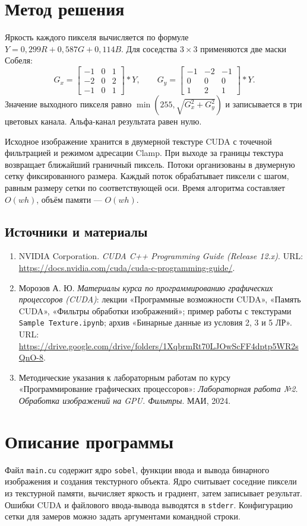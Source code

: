 \documentclass[12pt,a4paper]{article}
\begin{document}
\section{Метод решения}
Яркость каждого пикселя вычисляется по формуле $Y = 0{,}299R + 0{,}587G + 0{,}114B$. Для соседства $3\times3$ применяются две маски Собеля:
\[
G_x=\begin{bmatrix}-1&0&1\\-2&0&2\\-1&0&1\end{bmatrix} * Y,\qquad
G_y=\begin{bmatrix}-1&-2&-1\\0&0&0\\1&2&1\end{bmatrix} * Y.
\]
Значение выходного пикселя равно $\min(255,\sqrt{G_x^2+G_y^2})$ и записывается в три цветовых канала. Альфа-канал результата равен нулю.

Исходное изображение хранится в двумерной текстуре CUDA с точечной фильтрацией и режимом адресации Clamp. При выходе за границы текстура возвращает ближайший граничный пиксель. Потоки организованы в двумерную сетку фиксированного размера. Каждый поток обрабатывает пиксели с шагом, равным размеру сетки по соответствующей оси. Время алгоритма составляет $O(w h)$, объём памяти --- $O(w h)$.

\subsection*{Источники и материалы}
\begin{enumerate}
    \item NVIDIA Corporation. \textit{CUDA C++ Programming Guide (Release 12.x)}. URL: \url{https://docs.nvidia.com/cuda/cuda-c-programming-guide/}.
    \item Морозов А. Ю. \textit{Материалы курса по программированию графических процессоров (CUDA)}: лекции «Программные возможности CUDA», «Память CUDA», «Фильтры обработки изображений»; пример работы с текстурами \texttt{Sample Texture.ipynb}; архив «Бинарные данные из условия 2, 3 и 5 ЛР». URL: \url{https://drive.google.com/drive/folders/1XqbrmRt70LJOwScFF4dptp5WR2sQnO-8}.
    \item Методические указания к лабораторным работам по курсу «Программирование графических процессоров»: \textit{Лабораторная работа №2. Обработка изображений на GPU. Фильтры}. МАИ, 2024.
\end{enumerate}

\newpage
\section{Описание программы}
Файл \texttt{main.cu} содержит ядро \texttt{sobel}, функции ввода и вывода бинарного изображения и создания текстурного объекта. Ядро считывает соседние пиксели из текстурной памяти, вычисляет яркость и градиент, затем записывает результат. Ошибки CUDA и файлового ввода-вывода выводятся в \texttt{stderr}. Конфигурацию сетки для замеров можно задать аргументами командной строки.
\end{document}
